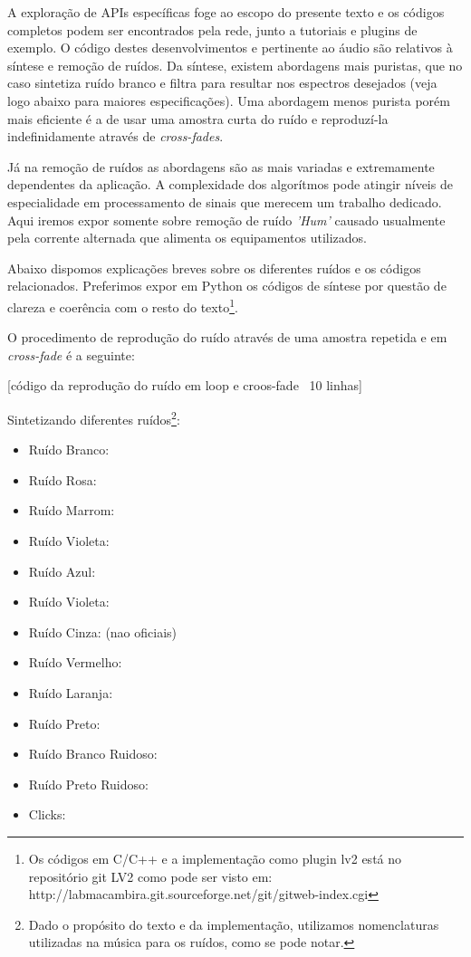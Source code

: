 A exploração de APIs específicas foge ao escopo do presente texto e os
códigos completos podem ser encontrados pela rede, junto a tutoriais e
plugins de exemplo. O código destes desenvolvimentos e pertinente ao
áudio são relativos à síntese e remoção de ruídos. Da síntese, existem
abordagens mais puristas, que no caso sintetiza ruído branco e filtra
para resultar nos espectros desejados (veja logo abaixo para maiores
especificações). Uma abordagem menos purista porém mais eficiente é a
de usar uma amostra curta do ruído e reproduzí-la indefinidamente
através de \emph{cross-fades}.

Já na remoção de ruídos as abordagens são as mais variadas e
extremamente dependentes da aplicação. A complexidade dos algorítmos
pode atingir níveis de especialidade em processamento de sinais que
merecem um trabalho dedicado. Aqui iremos expor somente sobre remoção
de ruído \emph{'Hum'} causado usualmente pela corrente alternada que
alimenta os equipamentos utilizados.

Abaixo dispomos explicações breves sobre os diferentes ruídos e os
códigos relacionados. Preferimos expor em Python os códigos de síntese
por questão de clareza e coerência com o resto do texto\footnote{Os
  códigos em C/C++ e a implementação como plugin lv2 está no
  repositório git LV2 como pode ser visto em:
  http://labmacambira.git.sourceforge.net/git/gitweb-index.cgi}.

O procedimento de reprodução do ruído através de uma amostra repetida
e em \textit{cross-fade} é a seguinte:

[código da reprodução do ruído em loop e croos-fade ~10 linhas]

Sintetizando diferentes ruídos\footnote{Dado o propósito do texto e da
  implementação, utilizamos nomenclaturas utilizadas na música para os
  ruídos, como se pode notar.}:

\begin{itemize}
    \item Ruído Branco: 
    \item Ruído Rosa:
    \item Ruído Marrom:
    \item Ruído Violeta:
    \item Ruído Azul:
    \item Ruído Violeta:
    \item Ruído Cinza:
    (nao oficiais)
    \item Ruído Vermelho:
    \item Ruído Laranja:
    \item Ruído Preto:
    \item Ruído Branco Ruidoso:
    \item Ruído Preto Ruidoso:
    \item Clicks:
\end{itemize} 

